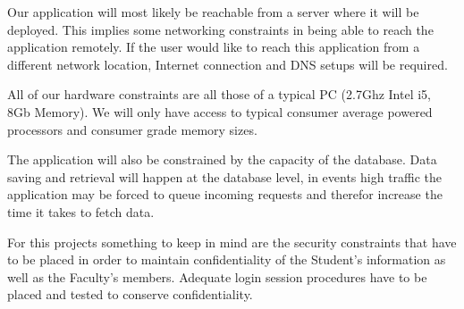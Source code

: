 
Our application will most likely be reachable from a server where it will be deployed. This implies some networking constraints in being able to reach the application remotely. If the user would like to reach this application from a different network location, Internet connection and DNS setups will be required. 

All of our hardware constraints are all those of a typical PC (2.7Ghz Intel i5, 8Gb Memory). We will only have access to typical consumer average powered processors and consumer grade memory sizes.

The application will also be constrained by the capacity of the database. Data saving and retrieval will happen at the database level, in events high traffic the application may be forced to queue incoming requests and therefor increase the time it takes to fetch data.

For this projects something to keep in mind are the security constraints that have to be placed in order to maintain confidentiality of the Student’s information as well as the Faculty’s members. Adequate login session procedures have to be placed and tested to conserve confidentiality.
